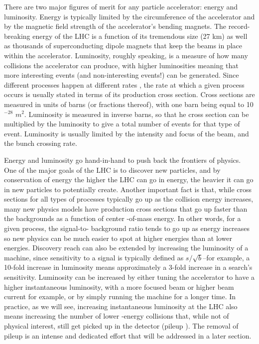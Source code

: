 There are two major figures of merit for any particle accelerator: energy and luminosity.  Energy is typically limited 
by the circumference of the accelerator and by the magnetic field strength of the accelerator's bending magnets.  
The record-breaking energy of the LHC is a function of its tremendous size (27 km) as 
well as thousands of superconducting dipole magnets that keep the beams in place within the accelerator.  Luminosity, roughly 
speaking, is a measure of how many collisions the accelerator can produce, with higher luminosities meaning that more 
interesting events (and non-interesting events!) can be generated.  Since different processes happen at different rates
, the rate at which a given process occurs is usually stated in terms of its production cross section.  
Cross sections are measured in units of barns (or fractions thereof), with one barn being equal to 10
$^{-28}$ $m^2$.  Luminosity is measured in inverse barns, so that he cross section 
can be multiplied by the luminosity to give a total number of events for that type of event.  Luminosity 
is usually limited by the intensity and focus of the beam, and the bunch crossing rate.

Energy and luminosity go hand-in-hand to push back the frontiers of physics.  One of the 
major goals of the LHC is to discover new particles, and by conservation of energy the higher the LHC 
can go in energy, the heavier it can go in new particles to potentially create.  Another important fact 
is that, while cross sections for all types of processes typically go up as the collision energy increases, 
many new physics models have production cross sections that go up faster than the backgrounds as a function of center
-of-mass energy.  In other words, for a given process, the signal-to-
background ratio tends to go up as energy increases so new physics can be much easier to spot at higher 
energies than at lower energies.  Discovery reach can also be extended by increasing the luminosity of a machine, 
since sensitivity to a signal is typically defined as $s/\sqrt{b}$--for example, a 
10-fold increase in luminosity means approximately a 3-fold increase in a search's sensitivity.  
Luminosity can be increased by either tuning the accelerator to have a higher instantaneous luminosity, with a more focused 
beam or higher beam current for example, or by simply running the machine for a longer time.  In 
practice, as we will see, increasing instantaneous luminosity at the LHC also means increasing the number of lower
-energy collisions that, while not of physical interest, still get picked up in the detector (pileup
).  The removal of pileup is an intense and dedicated effort that will be addressed in a later section.



